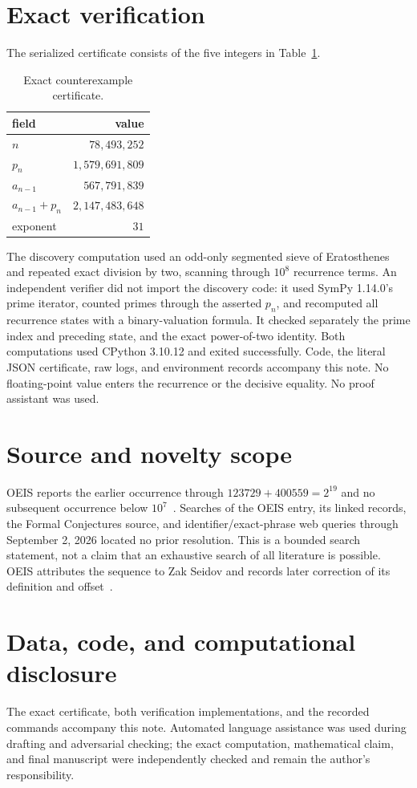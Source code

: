 \documentclass[11pt]{article}
\begin{document}
\section{Exact verification}
The serialized certificate consists of the five integers in Table~\ref{tab:w}.
\begin{table}[h]\centering
\begin{tabular}{lr}\toprule field & value\\ \midrule
$n$ & $78{,}493{,}252$\\
$p_n$ & $1{,}579{,}691{,}809$\\
$a_{n-1}$ & $567{,}791{,}839$\\
$a_{n-1}+p_n$ & $2{,}147{,}483{,}648$\\
exponent & $31$\\ \bottomrule\end{tabular}
\caption{Exact counterexample certificate.}\label{tab:w}
\end{table}
The discovery computation used an odd-only segmented sieve of Eratosthenes and repeated exact division by two, scanning through $10^8$ recurrence terms. An independent verifier did not import the discovery code: it used SymPy 1.14.0's prime iterator, counted primes through the asserted $p_n$, and recomputed all recurrence states with a binary-valuation formula. It checked separately the prime index and preceding state, and the exact power-of-two identity. Both computations used CPython 3.10.12 and exited successfully. Code, the literal JSON certificate, raw logs, and environment records accompany this note. No floating-point value enters the recurrence or the decisive equality. No proof assistant was used.
\section{Source and novelty scope}
OEIS reports the earlier occurrence through $123729+400559=2^{19}$ and no subsequent occurrence below $10^7$~\cite{oeis114216}. Searches of the OEIS entry, its linked records, the Formal Conjectures source, and identifier/exact-phrase web queries through September 2, 2026 located no prior resolution. This is a bounded search statement, not a claim that an exhaustive search of all literature is possible. OEIS attributes the sequence to Zak Seidov and records later correction of its definition and offset~\cite{oeis114216}.
\section*{Data, code, and computational disclosure}
The exact certificate, both verification implementations, and the recorded
commands accompany this note. Automated language assistance was used during
drafting and adversarial checking; the exact computation, mathematical claim,
and final manuscript were independently checked and remain the author's
responsibility.


\end{document}
